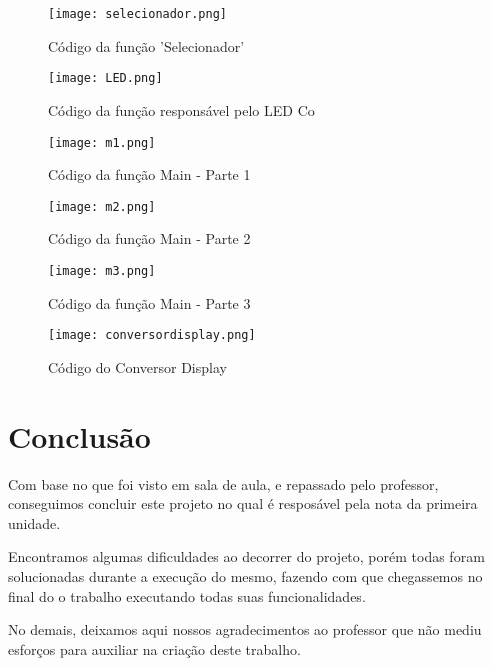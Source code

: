 \documentclass[
	12pt,				%
	openright,			%
	oneside,			%
	a4paper,			%
	brazil,				%
	]{abntex2}
\begin{document}
        \begin{figure}[h!]
        \centering
        \texttt{[image: selecionador.png]}
        \caption{Código da função 'Selecionador'}
        \end{figure}

        \begin{figure}[h!]
        \centering
        \texttt{[image: LED.png]}
        \caption{Código da função responsável pelo LED Co}
        \end{figure}

        \begin{figure}[h!]
        \centering
        \texttt{[image: m1.png]}
        \caption{Código da função Main - Parte 1}
        \end{figure}

        \begin{figure}[h!]
        \centering
        \texttt{[image: m2.png]}
        \caption{Código da função Main - Parte 2}
        \end{figure}

        \begin{figure}[h!]
        \centering
        \texttt{[image: m3.png]}
        \caption{Código da função Main - Parte 3}
        \end{figure}

        \begin{figure}[h!]
        \centering
        \texttt{[image: conversordisplay.png]}
        \caption{Código do Conversor Display}
        \label{fig:superficie}
        \end{figure}

\chapter{Conclusão}
    
Com base no que foi visto em sala de aula, e repassado pelo professor, conseguimos concluir este projeto no qual é resposável pela nota da primeira unidade. 

Encontramos algumas dificuldades ao decorrer do projeto, porém todas foram solucionadas durante a execução do mesmo, fazendo com que chegassemos no final do o trabalho executando todas suas funcionalidades. 

No demais, deixamos aqui nossos agradecimentos ao professor que não mediu esforços para auxiliar na criação deste trabalho.
    
%

    
\end{document}
